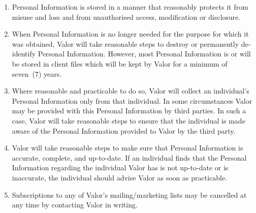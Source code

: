 \documentclass[10pt]{article}
\begin{document}
\begin{enumerate}[(1)]
\item
Personal Information is stored in a manner that reasonably protects it from misuse and loss and from unauthorised access, modification or disclosure.

\item
When Personal Information is no longer needed for the purpose for which it was obtained, Valor will take reasonable steps to destroy or permanently de-identify Personal Information. However, most Personal Information is or will be stored in client files which will be kept by Valor for a minimum of seven~(7) years.

\item
Where reasonable and practicable to do so, Valor will collect an individual's Personal Information only from that individual. In some circumstances Valor may be provided with this Personal Information by third parties. In such a case, Valor will take reasonable steps to ensure that the individual is made aware of the Personal Information provided to Valor by the third party.

\item
Valor will take reasonable steps to make sure that Personal Information is accurate, complete, and up-to-date. If an individual finds that the Personal Information regarding the individual Valor has is not up-to-date or is inaccurate, the individual should advise Valor as soon as practicable.

\item
Subscriptions to any of Valor's mailing/marketing lists may be cancelled at any time by contacting Valor in writing.
\end{enumerate}
\end{document}
